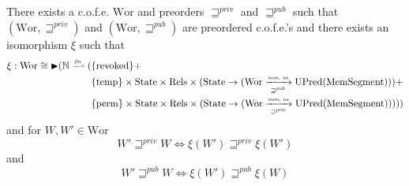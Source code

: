 \documentclass[a4paper]{article}
\newcommand{\finparfun}{\xrightharpoonup{\textit{\tiny{fin}}}}
\newcommand{\monnefun}{\xrightarrow{\textit{\tiny{mon, ne}}}}
\newcommand{\fun}{\rightarrow}
\newcommand{\blater}{\mathop{\blacktriangleright}}
\newcommand{\cofe}{c.o.f.e.}
\newcommand{\cofes}{\cofe{}'s}
\newcommand{\var}[1]{\mathit{#1}}
\newcommand{\future}{\mathbin{\sqsupseteq}}
\newcommand{\pub}{\var{pub}}
\newcommand{\priv}{\var{priv}}
\newcommand{\futurewk}{\mathbin{\sqsupseteq}^{\var{pub}}}
\newcommand{\futurestr}{\mathbin{\sqsupseteq}^{\var{priv}}}
\newcommand{\monwknefun}{\xrightarrow[\text{\tiny{$\futurewk$}}]{\textit{\tiny{mon, ne}}}}
\newcommand{\monstrnefun}{\xrightarrow[\text{\tiny{$\futurestr$}}]{\textit{\tiny{mon, ne}}}}
\newcommand{\plaindom}[1]{\mathrm{#1}}
\newcommand{\HeapSegments}{\plaindom{MemSegment}}
\newcommand{\nats}{\mathbb{N}}
\newcommand{\Rels}{\plaindom{Rels}}
\newcommand{\States}{\plaindom{State}}
\newcommand{\Wor}{\plaindom{Wor}}
\newcommand{\Worwk}{\Wor_{\futurewk}}
\newcommand{\Worstr}{\Wor_{\futurestr}}
\newcommand{\UPred}[1]{\plaindom{UPred}(#1)}
\newcommand{\plainview}[1]{\mathrm{#1}}
\newcommand{\perma}{\plainview{perm}}
\newcommand{\temp}{\plainview{temp}}
\newcommand{\revoked}{\plainview{revoked}}
\begin{document}
\begin{comment}
\begin{lemma}
There exists $\Worstr$ and $\Worwk$ are preordered \cofes{} and $\xi_\pub$ and $\xi_\priv$ are isomorphisms such that
\begin{align*}
  \xi_\pub :   \Worwk \cong \blater (\nats \finparfun (   & \{\revoked\} + \\
                                                                & \{\temp\} \times \States \times \Rels \times (\States \fun (\Worwk \monnefun \UPred{\HeapSegments})) + \\
                                                                & \{\perma\} \times \States \times \Rels \times (\States \fun (\Worstr \monnefun \UPred{\HeapSegments})),\future_\priv)) \\ \\
  \xi_\priv :   \Worstr \cong \blater (\nats \finparfun ( & \{\revoked\} \times \States \times \Rels \times (\States \fun (\Wor \monwknefun \UPred{\HeapSegments})) + \\
                                                                & \{\temp\} \times \States \times \Rels \times (\States \fun (\Worwk \monnefun \UPred{\HeapSegments})) + \\
                                                                & \{\perma\} \times \States \times \Rels \times (\States \fun (\Worstr \monnefun \UPred{\HeapSegments})),\future_\priv))
\end{align*}
\end{lemma}
\end{comment}

\begin{theorem}\label{thm:world-existence}
  There exists a \cofe{} $\Wor$ and preorders $\futurestr$ and $\futurewk$ such that $(\Wor,\futurestr)$ and $(\Wor,\futurewk)$ are preordered \cofes{} and there exists an isomorphism $\xi$ such that
  \begin{align*}
    \xi : \Wor \cong \blater (\nats \finparfun ( & \{\revoked\}  + \\
                                          & \{\temp\} \times \States \times \Rels \times (\States \fun (\Wor \monwknefun \UPred{\HeapSegments})) + \\
                                          & \{\perma\} \times \States \times \Rels \times (\States \fun (\Wor \monstrnefun \UPred{\HeapSegments}))))
  \end{align*}
 and for $W, W' \in \Wor$
 \[
   W' \futurestr W \Leftrightarrow \xi(W') \futurestr \xi(W')
 \]
and
 \[
   W' \futurewk W \Leftrightarrow \xi(W') \futurewk \xi(W)
 \]
\end{theorem}
\end{document}
